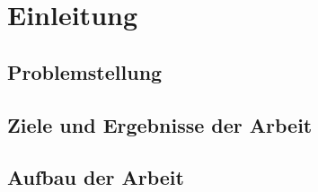 \chapter{Einleitung}
\label{chap:einleitung}

\newpage
\section{Problemstellung}
\label{sec:problemstellung}

\newpage
\section{Ziele und Ergebnisse der Arbeit}
\label{sec:zieleundergebnis}

\section{Aufbau der Arbeit}

\newpage